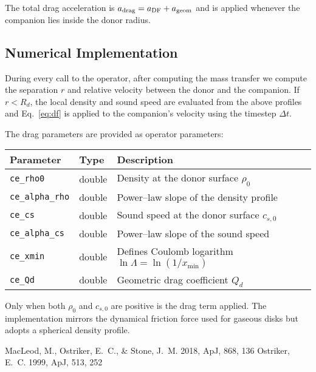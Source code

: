 The total drag acceleration is $a_{\rm drag}=a_{\rm DF}+a_{\rm geom}$ and
is applied whenever the companion lies inside the donor radius.

\subsection{Numerical Implementation}
During every call to the operator, after computing the mass transfer we
compute the separation $r$ and relative velocity between the donor and
the companion.  If $r<R_d$, the local density and sound speed are
evaluated from the above profiles and Eq.~\eqref{eq:df} is applied to the
companion's velocity using the timestep $\Delta t$.

The drag parameters are provided as operator parameters:
\begin{center}
\begin{tabular}{lll}
Parameter & Type & Description\\\hline
\texttt{ce\_rho0} & double & Density at the donor surface $\rho_0$\\
\texttt{ce\_alpha\_rho} & double & Power--law slope of the density profile\\
\texttt{ce\_cs} & double & Sound speed at the donor surface $c_{s,0}$\\
\texttt{ce\_alpha\_cs} & double & Power--law slope of the sound speed\\
\texttt{ce\_xmin} & double & Defines Coulomb logarithm $\ln\Lambda=\ln(1/x_{\min})$\\
\texttt{ce\_Qd} & double & Geometric drag coefficient $Q_d$\\
\end{tabular}
\end{center}

Only when both $\rho_0$ and $c_{s,0}$ are positive is the drag term
applied.  The implementation mirrors the dynamical friction force used
for gaseous disks but adopts a spherical density profile.


\begin{thebibliography}{99}
 MacLeod, M., Ostriker, E.~C., 
      & Stone, J.~M. 2018, ApJ, 868, 136
 Ostriker, E.~C. 1999, ApJ, 513, 252
\end{thebibliography}
